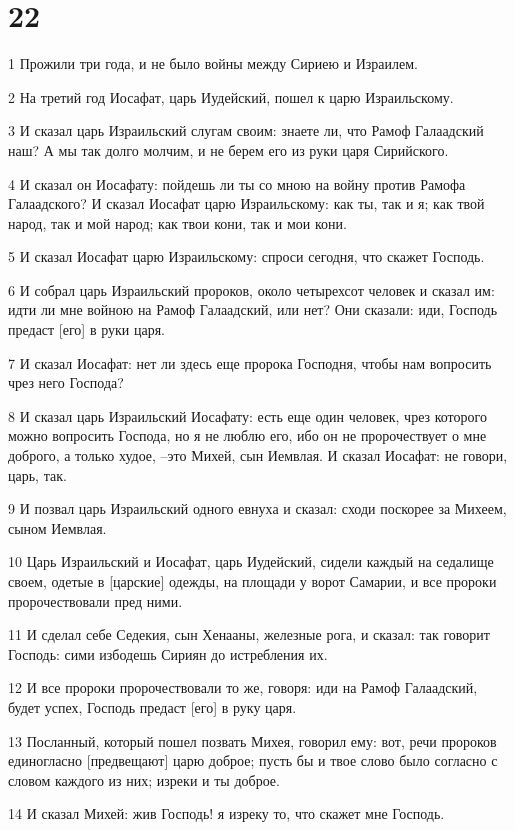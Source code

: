 \chapter{22}

\par 1 Прожили три года, и не было войны между Сириею и Израилем.
\par 2 На третий год Иосафат, царь Иудейский, пошел к царю Израильскому.
\par 3 И сказал царь Израильский слугам своим: знаете ли, что Рамоф Галаадский наш? А мы так долго молчим, и не берем его из руки царя Сирийского.
\par 4 И сказал он Иосафату: пойдешь ли ты со мною на войну против Рамофа Галаадского? И сказал Иосафат царю Израильскому: как ты, так и я; как твой народ, так и мой народ; как твои кони, так и мои кони.
\par 5 И сказал Иосафат царю Израильскому: спроси сегодня, что скажет Господь.
\par 6 И собрал царь Израильский пророков, около четырехсот человек и сказал им: идти ли мне войною на Рамоф Галаадский, или нет? Они сказали: иди, Господь предаст [его] в руки царя.
\par 7 И сказал Иосафат: нет ли здесь еще пророка Господня, чтобы нам вопросить чрез него Господа?
\par 8 И сказал царь Израильский Иосафату: есть еще один человек, чрез которого можно вопросить Господа, но я не люблю его, ибо он не пророчествует о мне доброго, а только худое, --это Михей, сын Иемвлая. И сказал Иосафат: не говори, царь, так.
\par 9 И позвал царь Израильский одного евнуха и сказал: сходи поскорее за Михеем, сыном Иемвлая.
\par 10 Царь Израильский и Иосафат, царь Иудейский, сидели каждый на седалище своем, одетые в [царские] одежды, на площади у ворот Самарии, и все пророки пророчествовали пред ними.
\par 11 И сделал себе Седекия, сын Хенааны, железные рога, и сказал: так говорит Господь: сими избодешь Сириян до истребления их.
\par 12 И все пророки пророчествовали то же, говоря: иди на Рамоф Галаадский, будет успех, Господь предаст [его] в руку царя.
\par 13 Посланный, который пошел позвать Михея, говорил ему: вот, речи пророков единогласно [предвещают] царю доброе; пусть бы и твое слово было согласно с словом каждого из них; изреки и ты доброе.
\par 14 И сказал Михей: жив Господь! я изреку то, что скажет мне Господь.
